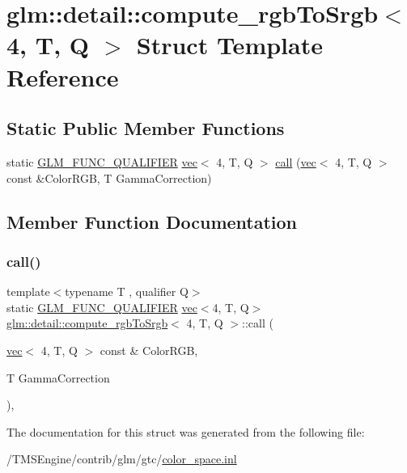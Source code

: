 \hypertarget{structglm_1_1detail_1_1compute__rgb_to_srgb_3_014_00_01_t_00_01_q_01_4}{}\section{glm\+:\+:detail\+:\+:compute\+\_\+rgb\+To\+Srgb$<$ 4, T, Q $>$ Struct Template Reference}
\label{structglm_1_1detail_1_1compute__rgb_to_srgb_3_014_00_01_t_00_01_q_01_4}
\subsection*{Static Public Member Functions}
\begin{DoxyCompactItemize}
\item 
static \hyperlink{setup_8hpp_a33fdea6f91c5f834105f7415e2a64407}{G\+L\+M\+\_\+\+F\+U\+N\+C\+\_\+\+Q\+U\+A\+L\+I\+F\+I\+ER} \hyperlink{structglm_1_1vec}{vec}$<$ 4, T, Q $>$ \hyperlink{structglm_1_1detail_1_1compute__rgb_to_srgb_3_014_00_01_t_00_01_q_01_4_aedf4da586350c728943a249325c9d9c9}{call} (\hyperlink{structglm_1_1vec}{vec}$<$ 4, T, Q $>$ const \&Color\+R\+GB, T Gamma\+Correction)
\end{DoxyCompactItemize}


\subsection{Member Function Documentation}
\mbox{\label{structglm_1_1detail_1_1compute__rgb_to_srgb_3_014_00_01_t_00_01_q_01_4_aedf4da586350c728943a249325c9d9c9}} 
\subsubsection{\texorpdfstring{call()}{call()}}
{\footnotesize\ttfamily template$<$typename T , qualifier Q$>$ \\
static \hyperlink{setup_8hpp_a33fdea6f91c5f834105f7415e2a64407}{G\+L\+M\+\_\+\+F\+U\+N\+C\+\_\+\+Q\+U\+A\+L\+I\+F\+I\+ER} \hyperlink{structglm_1_1vec}{vec}$<$4, T, Q$>$ \hyperlink{structglm_1_1detail_1_1compute__rgb_to_srgb}{glm\+::detail\+::compute\+\_\+rgb\+To\+Srgb}$<$ 4, T, Q $>$\+::call (\begin{DoxyParamCaption}\item[{\hyperlink{structglm_1_1vec}{vec}$<$ 4, T, Q $>$ const \&}]{Color\+R\+GB,  }\item[{T}]{Gamma\+Correction }\end{DoxyParamCaption})\hspace{0.3cm}{\ttfamily [inline]}, {\ttfamily [static]}}



The documentation for this struct was generated from the following file\+:\begin{DoxyCompactItemize}
\item 
/\+T\+M\+S\+Engine/contrib/glm/gtc/\hyperlink{gtc_2color__space_8inl}{color\+\_\+space.\+inl}\end{DoxyCompactItemize}
